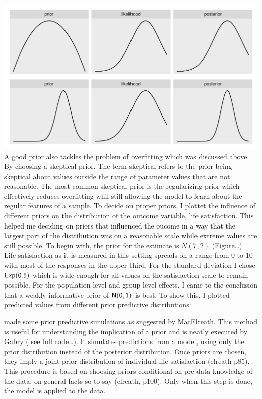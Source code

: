 \documentclass[a4, 12pt]{article}
\begin{document}
\includegraphics[width=1\linewidth]{../figures/flat_peaked}
A good prior also tackles the problem of overfitting which was discussed above. By choosing a skeptical prior. The term skeptical refers to the prior being skeptical about values outside the range of parameter values that are not reasonable. The most common skeptical prior is the regularizing prior which effectively reduces overfitting whil still allowing the model to learn about the regular features of a sample.
To decide on proper priors, I plottet the influence of different priors on the distribution of the outcome variable, life satisfaction. This helped me deciding on priors that influenced the oucome in a way that the largest part of the distribution was on a reasonable scale while extreme values are still possible. To begin with, the prior for the estimate is \(N(7,2)\) (Figure\ldots). Life satisfaction as it is measured in this setting spreads on a range from 0 to 10 with most of the responses in the upper third. For the standard deviation I chose \(\sf {Exp}(0.5)\) which is wide enough for all values on the satisfaction scale to remain possible. For the population-level and group-level effects, I came to the conclusion that a weakly-informative prior of \(\sf {N}(0,1)\) is best. To show this, I plotted predicted values from different prior predictive distributions:

made some prior predictive simulations as suggested by MacElreath. This method is useful for understanding the implication of a prior and is neatly executed by Gabry ( see full code\ldots). It simulates predictions from a model, using only the prior distribution instead of the posterior distribution. Once priors are chosen, they imply a joint prior distribution of individual life satisfaction (elreath p85). This procedure is based on choosing priors conditional on pre-data knowledge of the data, on general facts so to say (elreath, p100). Only when this step is done, the model is applied to the data.
\end{document}
